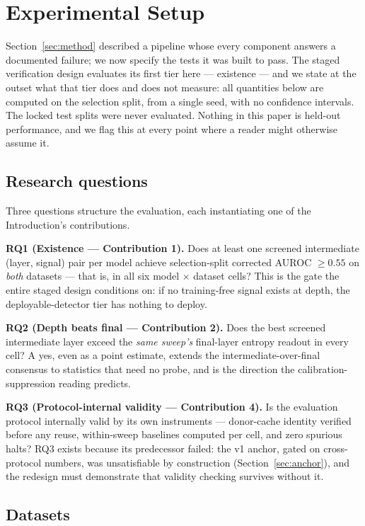 \section{Experimental Setup}
\label{sec:setup}

Section~\ref{sec:method} described a pipeline whose every component answers a documented failure; we now specify the tests it was built to pass. The staged verification design evaluates its first tier here --- existence --- and we state at the outset what that tier does and does not measure: all quantities below are computed on the selection split, from a single seed, with no confidence intervals. The locked test splits were never evaluated. Nothing in this paper is held-out performance, and we flag this at every point where a reader might otherwise assume it.

\subsection{Research questions}
\label{sec:rqs}

Three questions structure the evaluation, each instantiating one of the Introduction's contributions.

\textbf{RQ1 (Existence --- Contribution 1).} Does at least one screened intermediate (layer, signal) pair per model achieve selection-split corrected AUROC $\geq 0.55$ on \emph{both} datasets --- that is, in all six model $\times$ dataset cells? This is the gate the entire staged design conditions on: if no training-free signal exists at depth, the deployable-detector tier has nothing to deploy.

\textbf{RQ2 (Depth beats final --- Contribution 2).} Does the best screened intermediate layer exceed the \emph{same sweep's} final-layer entropy readout in every cell? A yes, even as a point estimate, extends the intermediate-over-final consensus to statistics that need no probe, and is the direction the calibration-suppression reading predicts.

\textbf{RQ3 (Protocol-internal validity --- Contribution 4).} Is the evaluation protocol internally valid by its own instruments --- donor-cache identity verified before any reuse, within-sweep baselines computed per cell, and zero spurious halts? RQ3 exists because its predecessor failed: the v1 anchor, gated on cross-protocol numbers, was unsatisfiable by construction (Section~\ref{sec:anchor}), and the redesign must demonstrate that validity checking survives without it.

\subsection{Datasets}
\label{sec:datasets}

